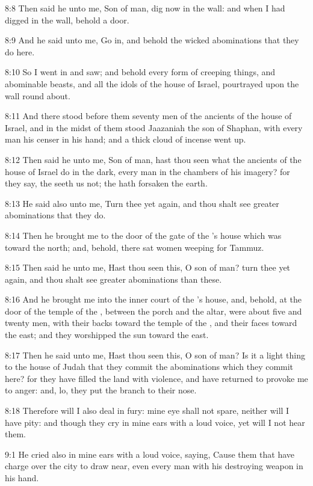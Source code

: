 8:8 Then said he unto me, Son of man, dig now in the wall: and when I had digged in the wall, behold a door.

8:9 And he said unto me, Go in, and behold the wicked abominations that they do here.

8:10 So I went in and saw; and behold every form of creeping things, and abominable beasts, and all the idols of the house of Israel, pourtrayed upon the wall round about.

8:11 And there stood before them seventy men of the ancients of the house of Israel, and in the midst of them stood Jaazaniah the son of Shaphan, with every man his censer in his hand; and a thick cloud of incense went up.

8:12 Then said he unto me, Son of man, hast thou seen what the ancients of the house of Israel do in the dark, every man in the chambers of his imagery? for they say, the \LORD seeth us not; the \LORD hath forsaken the earth.

8:13 He said also unto me, Turn thee yet again, and thou shalt see greater abominations that they do.

8:14 Then he brought me to the door of the gate of the \LORD's house which was toward the north; and, behold, there sat women weeping for Tammuz.

8:15 Then said he unto me, Hast thou seen this, O son of man? turn thee yet again, and thou shalt see greater abominations than these.

8:16 And he brought me into the inner court of the \LORD's house, and, behold, at the door of the temple of the \LORD, between the porch and the altar, were about five and twenty men, with their backs toward the temple of the \LORD, and their faces toward the east; and they worshipped the sun toward the east.

8:17 Then he said unto me, Hast thou seen this, O son of man? Is it a light thing to the house of Judah that they commit the abominations which they commit here? for they have filled the land with violence, and have returned to provoke me to anger: and, lo, they put the branch to their nose.

8:18 Therefore will I also deal in fury: mine eye shall not spare, neither will I have pity: and though they cry in mine ears with a loud voice, yet will I not hear them.

9:1 He cried also in mine ears with a loud voice, saying, Cause them that have charge over the city to draw near, even every man with his destroying weapon in his hand.


